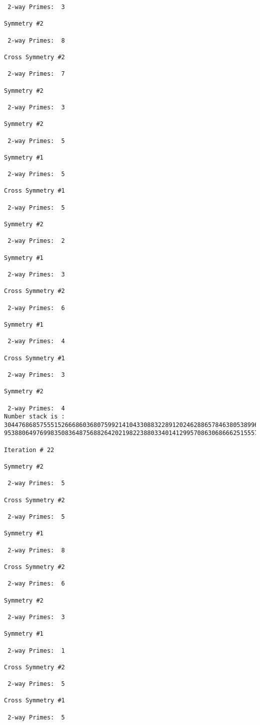 \begin{verbatim}
 2-way Primes: 	3

Symmetry #2

 2-way Primes: 	8

Cross Symmetry #2

 2-way Primes: 	7

Symmetry #2

 2-way Primes: 	3

Symmetry #2

 2-way Primes: 	5

Symmetry #1

 2-way Primes: 	5

Cross Symmetry #1

 2-way Primes: 	5

Symmetry #2

 2-way Primes: 	2

Symmetry #1

 2-way Primes: 	3

Cross Symmetry #2

 2-way Primes: 	6

Symmetry #1

 2-way Primes: 	4

Cross Symmetry #1

 2-way Primes: 	3

Symmetry #2

 2-way Primes: 	4
Number stack is :
30447686857555152666860368075992141043308832289120246288657846380538996794608835958544046240163340857
95388064976998350836487568826420219822388033401412995708630686662515557586867440375804336104264044585

Iteration #	22

Symmetry #2

 2-way Primes: 	5

Cross Symmetry #2

 2-way Primes: 	5

Symmetry #1

 2-way Primes: 	8

Cross Symmetry #2

 2-way Primes: 	6

Symmetry #2

 2-way Primes: 	3

Symmetry #1

 2-way Primes: 	1

Cross Symmetry #2

 2-way Primes: 	5

Cross Symmetry #1

 2-way Primes: 	5


\end{verbatim}
